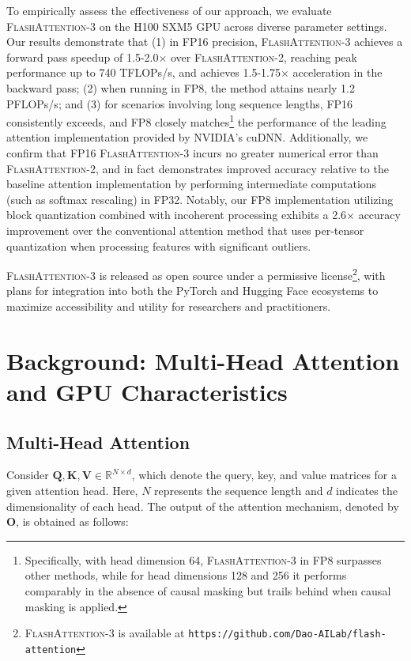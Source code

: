 \begin{enumerate}
To empirically assess the effectiveness of our approach, we evaluate \textsc{FlashAttention-3} on the H100 SXM5 GPU across diverse parameter settings. Our results demonstrate that (1) in FP16 precision, \textsc{FlashAttention-3} achieves a forward pass speedup of 1.5-2.0$\times$ over \textsc{FlashAttention-2}, reaching peak performance up to 740 TFLOPs/s, and achieves 1.5-1.75$\times$ acceleration in the backward pass; (2) when running in FP8, the method attains nearly 1.2 PFLOPs/s; and (3) for scenarios involving long sequence lengths, FP16 consistently exceeds, and FP8 closely matches\footnote{Specifically, with head dimension 64, \textsc{FlashAttention-3} in FP8 surpasses other methods, while for head dimensions 128 and 256 it performs comparably in the absence of causal masking but trails behind when causal masking is applied.} the performance of the leading attention implementation provided by NVIDIA's cuDNN. Additionally, we confirm that FP16 \textsc{FlashAttention-3} incurs no greater numerical error than \textsc{FlashAttention-2}, and in fact demonstrates improved accuracy relative to the baseline attention implementation by performing intermediate computations (such as softmax rescaling) in FP32. Notably, our FP8 implementation utilizing block quantization combined with incoherent processing exhibits a 2.6$\times$ accuracy improvement over the conventional attention method that uses per-tensor quantization when processing features with significant outliers.

\textsc{FlashAttention-3} is released as open source under a permissive license\footnote{\textsc{FlashAttention-3}
  is available at \texttt{https://github.com/Dao-AILab/flash-attention}}, with plans for integration into both the PyTorch and Hugging Face ecosystems to maximize accessibility and utility for researchers and practitioners.

\section{Background: Multi-Head Attention and GPU Characteristics}
\label{sec:background}

\subsection{Multi-Head Attention}
\label{subsec:multi_head_attn}

Consider $\mathbf{Q}, \mathbf{K}, \mathbf{V} \in \mathbb{R}^{N \times d}$, which denote the query, key, and value matrices for a given attention head. Here, $N$ represents the sequence length and $d$ indicates the dimensionality of each head. The output of the attention mechanism, denoted by $\mathbf{O}$, is obtained as follows:


\end{enumerate}
